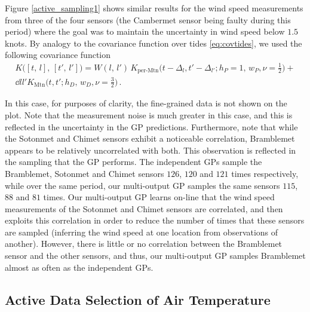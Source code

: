 \documentclass{acmtrans2m}
\newcommand{\dnt}[1]{_{{#1}}}
\newcommand{\Kl}[1]{K_{\text{#1}}}
\begin{document}
Figure \ref{active_sampling1} shows similar results for the wind speed measurements from three of the four sensors (the Cambermet sensor being faulty during this period) where the goal was to maintain the uncertainty in wind speed below $1.5$ knots. By analogy to the covariance function over tides \eqref{eq:covtides}, we used the following covariance function
\begin{multline*} %
 K\bigl([t,\,l],\,[t',\,l']\bigr)={W}(l,\,l')\,
\Kl{per-Mtn}\bigl(t-\Delta_{l},t'-\Delta_{l'};h\dnt{P}=1,\,w_P,\nu=\tfrac{1}{2}\bigr)+
\\
\dd{l}{l'}\Kl{Mtn}\bigl(t,t';h\dnt{D},\,w\dnt{D},\nu=\tfrac{3}{2}\bigr)
\,.
\end{multline*}

In this case, for purposes of clarity, the fine-grained data is not shown on the plot. Note that the measurement noise is much greater in this case, and this is reflected in the uncertainty in the GP predictions. Furthermore, note that while the Sotonmet and Chimet sensors exhibit a noticeable correlation, Bramblemet appears to be relatively uncorrelated with both. This observation is reflected in the sampling that the GP performs. The independent GPs sample the Bramblemet, Sotonmet and Chimet sensors $126$, $120$ and $121$ times respectively, while over the same period, our multi-output GP samples the same sensors $115$, $88$ and $81$ times. Our multi-output GP learns on-line that the wind speed measurements of the Sotonmet and Chimet sensors are correlated, and then exploits this correlation in order to reduce the number of times that these sensors are sampled (inferring the wind speed at one location from observations of another). However, there is little or no correlation between the Bramblemet sensor and the other sensors, and thus, our multi-output GP samples Bramblemet almost as often as the independent GPs.

\subsection{Active Data Selection of Air Temperature}
\end{document}
